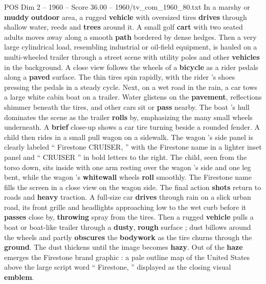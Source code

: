 \begin{textsample}{POS Dim 2 – 1960 – Score 36.00 – 1960/tv\_com\_1960\_80.txt}
In a marshy or \textbf{muddy} \textbf{outdoor} area, a rugged \textbf{vehicle} with oversized tires \textbf{drives} through shallow water, reeds and \textbf{trees} around it.
A small golf \textbf{cart} with two seated adults moves away along a smooth \textbf{path} bordered by dense hedges.
Then a very large cylindrical load, resembling industrial or oil-field equipment, is hauled on a multi-wheeled trailer through a street scene with utility poles and other \textbf{vehicles} in the background.
A close view follows the wheels of a \textbf{bicycle} as a rider pedals along a \textbf{paved} surface.
The thin tires spin rapidly, with the rider ’s shoes pressing the pedals in a steady cycle.
Next, on a wet road in the rain, a car tows a large white cabin boat on a trailer.
Water glistens on the \textbf{pavement}, reflections shimmer beneath the tires, and other cars sit or \textbf{pass} nearby.
The boat ’s hull dominates the scene as the trailer \textbf{rolls} by, emphasizing the many small wheels underneath.
A \textbf{brief} close-up shows a car tire turning beside a rounded fender.
A child then rides in a small pull wagon on a sidewalk.
The wagon ’s side panel is clearly labeled “ Firestone CRUISER, ” with the Firestone name in a lighter inset panel and “ CRUISER ” in bold letters to the right.
The child, seen from the torso down, sits inside with one arm resting over the wagon ’s side and one leg bent, while the wagon ’s \textbf{whitewall} wheels \textbf{roll} smoothly.
The Firestone name fills the screen in a close view on the wagon side.
The final action \textbf{shots} return to roads and \textbf{heavy} traction.
A full-size car \textbf{drives} through rain on a slick urban road, its front grille and headlights approaching low to the wet curb before it \textbf{passes} close by, \textbf{throwing} spray from the tires.
Then a rugged \textbf{vehicle} pulls a boat or boat-like trailer through a \textbf{dusty}, \textbf{rough} surface ; dust billows around the wheels and partly \textbf{obscures} the \textbf{bodywork} as the tire churns through the \textbf{ground}.
The dust thickens until the image becomes \textbf{hazy}.
Out of the \textbf{haze} emerges the Firestone brand graphic : a pale outline map of the United States above the large script word “ Firestone, ” displayed as the closing visual \textbf{emblem}.

\end{textsample}
